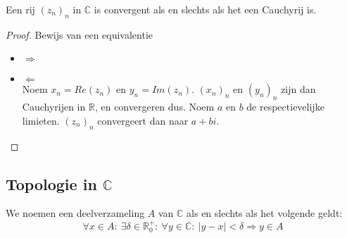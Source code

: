 \documentclass[main.tex]{subfiles}
\begin{document}
\begin{st}
  Een rij $(z_{n})_{n}$ in $\mathbb{C}$ is convergent als en slechts als het een Cauchyrij is.

  \begin{proof}
    Bewijs van een equivalentie\\
    \begin{itemize}
    \item $\Rightarrow$\\
    \item $\Leftarrow$\\
      Noem $x_{n} = Re(z_{n})$ en $y_{n} = Im(z_{n})$.
      $(x_{n})_{n}$ en $(y_{n})_{n}$ zijn dan Cauchyrijen in $\mathbb{R}$, en convergeren dus.
      Noem $a$ en $b$ de respectievelijke limieten.
      $(z_{n})_{n}$ convergeert dan naar $a+bi$.
    \end{itemize}
  \end{proof}
\end{st}

\subsection{Topologie in $\mathbb{C}$}
\label{sec:topologie-mathbbc}

\begin{de}
  We noemen een deelverzameling $A$ van $\mathbb{C}$  als en slechts als het volgende geldt:
  \[ \forall x\in A:\ \exists \delta \in \mathbb{R}_{0}^{+}:\ \forall y\in \mathbb{C}:\ |y-x| < \delta \Rightarrow y \in A \]
\end{de}
\end{document}
